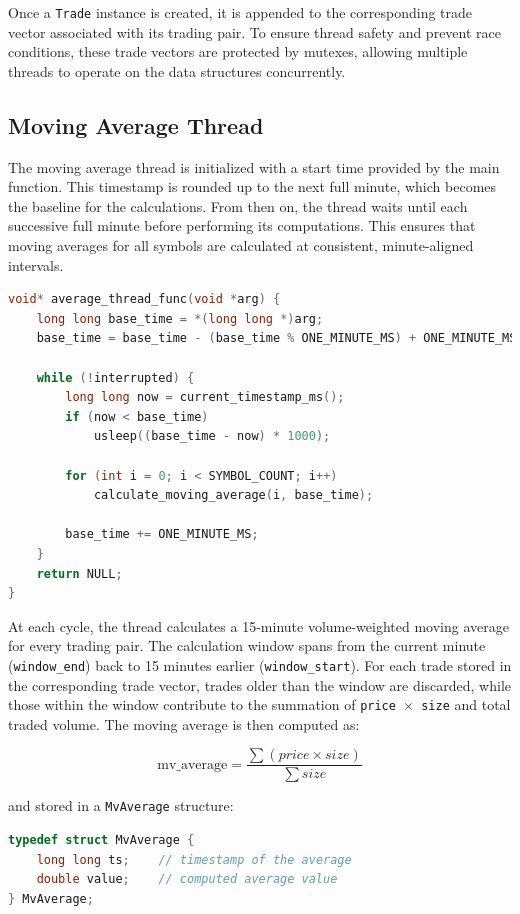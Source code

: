 \documentclass[11pt]{article}
\begin{document}
Once a \texttt{Trade} instance is created, it is appended to the corresponding trade vector associated with its trading pair. To ensure thread safety and prevent race conditions, these trade vectors are protected by mutexes, allowing multiple threads to operate on the data structures concurrently.

\subsection{Moving Average Thread}

The moving average thread is initialized with a start time provided by the main function. This timestamp is rounded up to the next full minute, which becomes the baseline for the calculations. From then on, the thread waits until each successive full minute before performing its computations. This ensures that moving averages for all symbols are calculated at consistent, minute-aligned intervals.

\begin{lstlisting}[language=C]
void* average_thread_func(void *arg) {
    long long base_time = *(long long *)arg;
    base_time = base_time - (base_time % ONE_MINUTE_MS) + ONE_MINUTE_MS;

    while (!interrupted) {
        long long now = current_timestamp_ms();
        if (now < base_time)
            usleep((base_time - now) * 1000);

        for (int i = 0; i < SYMBOL_COUNT; i++)
            calculate_moving_average(i, base_time);

        base_time += ONE_MINUTE_MS;
    }
    return NULL;
}
\end{lstlisting}

At each cycle, the thread calculates a 15-minute volume-weighted moving average for every trading pair. The calculation window spans from the current minute (\texttt{window\_end}) back to 15 minutes earlier (\texttt{window\_start}). For each trade stored in the corresponding trade vector, trades older than the window are discarded, while those within the window contribute to the summation of \texttt{price $\times$ size} and total traded volume. The moving average is then computed as:

\[
\text{mv\_average} = \frac{\sum (price \times size)}{\sum size}
\]

and stored in a \texttt{MvAverage} structure:

\begin{lstlisting}[language=C]
typedef struct MvAverage {
    long long ts;    // timestamp of the average
    double value;    // computed average value
} MvAverage;
\end{lstlisting}
\end{document}
